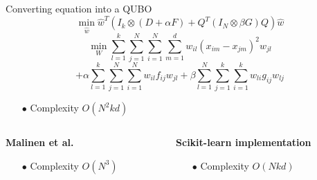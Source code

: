 	\begin{frame}{Converting equation into a QUBO}
		$$\min _{\hat{w}} \hat{w}^{T}\left(I_{k} \otimes(D+\alpha F)+Q^{T}\left(I_{N} \otimes \beta G\right) Q\right) \hat{w}$$
		\bigbreak
		$$
			\min _{W} \sum_{l=1}^k \sum_{j=1}^N \sum_{i=1}^N \sum_{m=1}^d w_{i l}\left(x_{i m}-x_{j m}\right)^{2} w_{jl}
		$$
		$$
			+\alpha \sum_{l=1}^{k} \sum_{j=1}^{N} \sum_{i=1}^{N} w_{il} f_{ij} w_{j l}+\beta \sum_{l=1}^{N} \sum_{j=1}^{k} \sum_{i=1}^{k} w_{li} g_{i j} w_{lj}
		$$
		\begin{itemize}
			\item[$\bullet$] Complexity $O(N^2 k d)$ 
		\end{itemize}
		\bigbreak
		\begin{columns}
			\begin{column}{0.5\textwidth}
				\textbf{Malinen et al.}
				\begin{itemize}
					\item[$\bullet$] Complexity $O(N^3)$ 
				\end{itemize}
			\end{column}
			\begin{column}{0.5\textwidth}  
				\textbf{Scikit-learn implementation}
				\begin{itemize}
					\item[$\bullet$] Complexity $O(Nkd)$ 
				\end{itemize}
			\end{column}
		\end{columns}

		\bigbreak		
	\end{frame}


